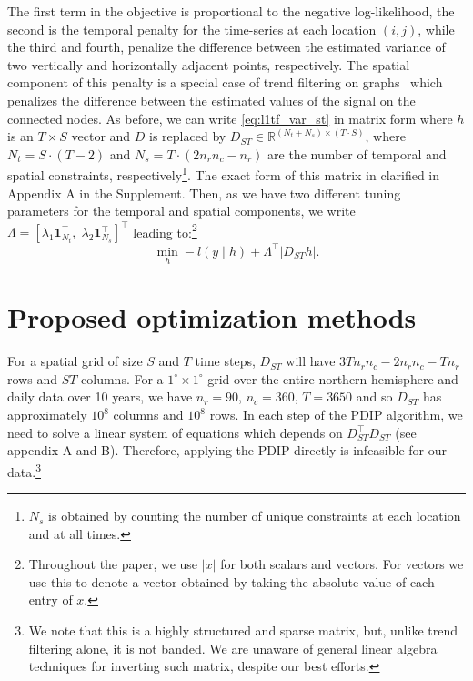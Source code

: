 \documentclass{article}
\newcommand{\one}{\mathbf{1}}
\newcommand{\given}{\;\vert\;}
\begin{document}
The first term in the objective is proportional to the negative
log-likelihood, the second is the temporal penalty for the
time-series at each location $(i,j)$, while the third and fourth,
penalize the difference between the estimated variance of two
vertically and horizontally adjacent points, respectively. The spatial
component of this
penalty is a special case of trend filtering on graphs~\citep{WangSharpnack2016} which penalizes the difference between the estimated values of the signal on the connected nodes. As before, we can write \eqref{eq:l1tf_var_st} in matrix form where $h$ is an $T\times S$ vector and $D$ is replaced by $D_{ST} \in \mathbb{R}^{(N_t+N_s) \times (T \cdot S)	}$, where $N_t=S \cdot (T-2)$ and $N_s=T \cdot (2n_rn_c-n_r)$ are the number of temporal and spatial constraints, respectively\footnote{$N_s$ is obtained by counting the number of unique constraints at each location and at all times.}. The exact form of this matrix in clarified in Appendix A in the Supplement. Then, as we have two different tuning parameters for the temporal and spatial components, we write $\Lambda =\left[\lambda_1\one_{N_t}^\top,\;  \lambda_2\one_{N_s}^\top\right]^\top$ leading to:\footnote{Throughout the paper, we use $|x|$ for both scalars and vectors. For vectors we use this to denote a vector obtained by taking the absolute value of each entry of $x$.} 
\begin{equation}
\min_h -l(y\given h)+ \Lambda^\top | D_{ST}h |.
\label{eq:l1tf_var_st_mat}
\end{equation}

\section{Proposed optimization methods}
\label{sec:prop-optim-meth}

For a spatial grid of size $S$ and $T$ time steps, $D_{ST}$ will have
$3Tn_rn_c-2n_rn_c-Tn_r$ rows and $ST$ columns. For a $1^\circ\times
1^\circ$ grid over the entire northern hemisphere and daily data over
10 years, we have $n_r=90$, $n_c=360$, $T=3650$ and so $D_{ST}$ has
approximately $10^8$ columns and $10^8$ rows. In each step of the PDIP
algorithm, we need to solve a linear system of equations which
depends on $D_{ST}^\top D_{ST}$ (see appendix A and B). Therefore,
applying the PDIP directly is infeasible for our data.\footnote{We
  note that this is a highly structured and sparse matrix, but, unlike
  trend filtering alone, it is not banded. We are unaware of general
  linear algebra techniques for inverting such matrix, despite our
  best efforts.}  
\end{document}
